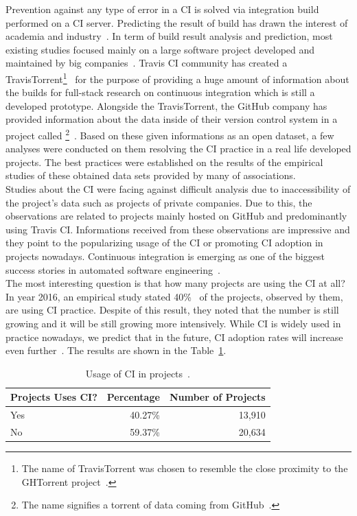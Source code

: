 Prevention against any type of error in a CI is solved via integration build performed on a CI server. Predicting the result of build has drawn the interest of academia and industry~\cite{ResultsOfCIbuild}. In term of build result analysis and prediction, most existing studies focused mainly on a large software project developed and maintained by big companies~\cite{ResultsOfCIbuild}. Travis CI community has created a TravisTorrent\footnote{The name of TravisTorrent was chosen to resemble the close proximity to the GHTorrent project~\cite{TravisTorrentWEBPAGE}.}~\cite{TravisTorrent} for the purpose of providing a huge amount of information about the builds for full-stack research on continuous integration which is still a developed prototype. Alongside the TravisTorrent, the GitHub company has provided information about the data inside of their version control system in a project called \footnote{The name signifies a torrent of data coming from GitHub~\cite{GHTorrentWEBPAGE}.}~\cite{GHTorrent}. Based on these given informations as an open dataset, a few analyses were conducted on them resolving the CI practice in a real life developed projects. The best practices were established on the results of the empirical studies of these obtained data sets provided by many of associations.\\

Studies about the CI were facing against difficult analysis due to inaccessibility of the project's data such as projects of private companies. Due to this, the observations are related to projects mainly hosted on GitHub and predominantly using Travis CI. Informations received from these observations are impressive and they point to the popularizing usage of the CI or promoting CI adoption in projects nowadays. Continuous integration is emerging as one of the biggest success stories in automated software engineering~\cite{COPE}.\\

The most interesting question is that how many projects are using the CI at all? In year 2016, an empirical study stated 40\%~\cite{COPE} of the projects, observed by them, are using CI practice. Despite of this result, they noted that the number is still growing and it will be still growing more intensively. While CI is widely used in practice nowadays, we predict that in the future, CI adoption rates will increase even further~\cite{COPE}. The results are shown in the Table~\ref{table:CI_usage}.

\begin{table}[H]
    \centering
    \begin{tabular}{|l|r|r|}
        \hline
        Projects Uses CI? & Percentage & Number of Projects \\
        \hline
        Yes               & 40.27\%    & 13,910             \\
        No                & 59.37\%    & 20,634             \\
        \hline
    \end{tabular}
    \caption{Usage of CI in projects~\cite{COPE}.}
    \label{table:CI_usage}
\end{table}

